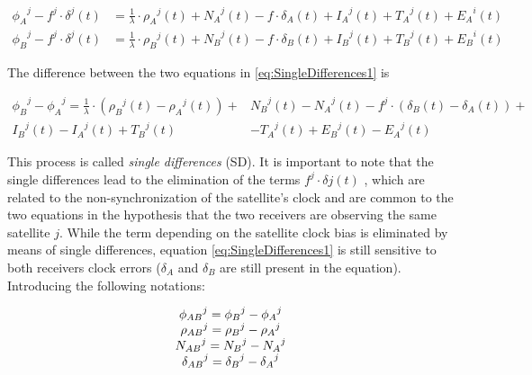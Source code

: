 \begin{equation}\begin{split} 
		{\phi_{A}}^{j}-f^{j}\cdot\delta^{j}(t) & = \frac{1}{\lambda}\cdot {\rho_{A}}^{j}(t) + {N_{A}}^{j}(t) - f\cdot \delta_{A}(t) + {I_{A}}^{j}(t) +{T_{A}}^{j}(t) + {E_{A}}^{i}(t)\\ {\phi_{B}}^{j}-f^{j}\cdot\delta^{j}(t) & = \frac{1}{\lambda}\cdot {\rho_{B}}^{j}(t) + {N_{B}}^{j}(t) - f\cdot \delta_{B}(t) + {I_{B}}^{j}(t) +{T_{B}}^{j}(t) + {E_{B}}^{i}(t) 
		\label{eq:SingleDifferences1}
	\end{split}
\end{equation}

The difference between the two equations in \ref{eq:SingleDifferences1} is

\begin{equation}\begin{split}
		{\phi_{B}}^{j}-{\phi_{A}}^{j} = \frac{1}{\lambda}\cdot \left({\rho_{B}}^{j}(t)-{\rho_{A}}^{j}(t)\right)+ & {N_{B}}^{j}(t)-{N_{A}}^{j}(t)- f^{j}\cdot \left(\delta_{B}(t)-\delta_{A}(t)\right) + \\ {I_{B}}^{j}(t)- {I_{A}}^{j}(t) +{T_{B}}^{j}(t) & - {T_{A}}^{j}(t) + {E_{B}}^{j}(t)-{E_{A}}^{j}(t)
		\label{eq:eq:SingleDifferences1}
	\end{split}
\end{equation}

This process is called \textit{single differences} (SD). It is important to note that the single differences lead to the elimination of the terms $f^{j}\cdot\delta{j}(t)$ , which are related to the non-synchronization of the satellite’s clock and are common to the two equations in the hypothesis that the two receivers are observing the same satellite $j$.
While the term depending on the satellite clock bias is eliminated by means of single differences, equation \ref{eq:SingleDifferences1} is still sensitive to both receivers clock errors ($\delta_{A}$ and $\delta_{B}$ are still present in the equation).
Introducing the following notations:

\begin{equation} 
	\begin{matrix} 
		{\phi_{AB}}^{j}={\phi_{B}}^{j}-{\phi_{A}}^{j}\\ {\rho_{AB}}^{j}={\rho_{B}}^{j}-{\rho_{A}}^{j}\\{N_{AB}}^{j}={N_{B}}^{j}-{N_{A}}^{j}\\{\delta_{AB}}^{j}={\delta_{B}}^{j}-{\delta_{A}}^{j}\end{matrix}
	\\
	\label{eq:notation1}
\end{equation}

